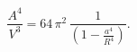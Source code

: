 \begin{equation}
\frac{A^4}{V^3}=64\,\pi^2 \, \frac{1}{\left(1-\frac{a^4}{R^4}\right)}.
\end{equation}

